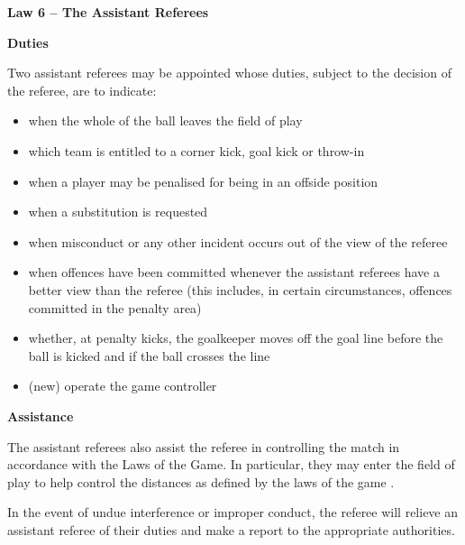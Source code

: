 \clearpage
\sffamily
{\bfseries\color[rgb]{0.4,0.4,0.4}
Law 6 -- The Assistant Referees}


\bigskip

{\bfseries Duties}

\headlinebox

Two assistant referees may be appointed whose duties, subject to the decision of the referee, are to indicate:

\begin{itemize}
\item when the whole of the ball leaves the field of play
\item which team is entitled to a corner kick, goal kick or throw-in
\item when a player may be penalised for being in an offside position 
\item when a substitution is requested
\item when misconduct or any other incident occurs out of the view of the referee 
\item when offences have been committed whenever the assistant referees have a better view than the referee (this includes, in certain circumstances, offences committed in the penalty area) 
\item whether, at penalty kicks, the goalkeeper moves off the goal line before the ball is kicked and if the ball crosses the line
\item (new) operate the game controller
\end{itemize}

{\bfseries Assistance}

\headlinebox

The assistant referees also assist the referee in controlling the match in accordance with the Laws of the Game. In particular, they may enter the field of play to help control the distances as defined by the laws of the game 
.

\bigskip

In the event of undue interference or improper conduct, the referee will relieve an assistant referee of their duties and make a report to the appropriate authorities.